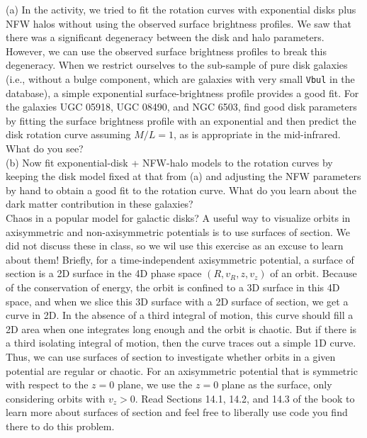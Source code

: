 \documentclass[12pt]{article}
\begin{document}
(a) In the activity, we tried to fit the rotation curves with exponential disks plus 
NFW halos without using the observed surface brightness profiles. We saw that there was 
a significant degeneracy between the disk and halo parameters. However, we can use the
observed surface brightness profiles to break this degeneracy. When we restrict 
ourselves to the sub-sample of pure disk galaxies (i.e., without a bulge component, 
which are galaxies with very small \texttt{Vbul} in the database), a simple exponential 
surface-brightness profile provides a good fit. For the galaxies UGC 05918, UGC 08490, and 
NGC 6503, find good disk parameters by fitting the surface brightness profile with an 
exponential and then predict the disk rotation curve assuming \(M/L=1\), as is 
appropriate in the mid-infrared. What do you see?\\

(b) Now fit exponential-disk + NFW-halo models to the rotation curves by keeping the 
disk model fixed at that from (a) and adjusting the NFW parameters by hand to obtain a 
good fit to the rotation curve. What do you learn about the dark matter contribution in 
these galaxies?\\

 Chaos in a popular model for galactic disks? A useful way to 
visualize orbits in axisymmetric and non-axisymmetric potentials is to use surfaces of
section. We did not discuss these in class, so we wil use this exercise as an excuse to 
learn about them! Briefly, for a time-independent axisymmetric potential, a surface of 
section is a 2D surface in the 4D phase space \((R,v_R,z,v_z)\) of an orbit. Because of 
the conservation of energy, the orbit is confined to a 3D surface in this 4D space, and
when we slice this 3D surface with a 2D surface of section, we get a curve in 2D. In the 
absence of a third integral of motion, this curve should fill a 2D area when one 
integrates long enough and the orbit is chaotic. But if there is a third isolating 
integral of motion, then the curve traces out a simple 1D curve. Thus, we can use 
surfaces of section to investigate whether orbits in a given potential are regular or 
chaotic. For an axisymmetric potential that is symmetric with respect to the \(z=0\) 
plane, we use the $z=0$ plane as the surface, only considering orbits with \(v_z > 0\). 
Read Sections 14.1, 14.2, and 14.3 of the book to learn more about surfaces of section 
and feel free to liberally use code you find there to do this problem.\\
\end{document}
